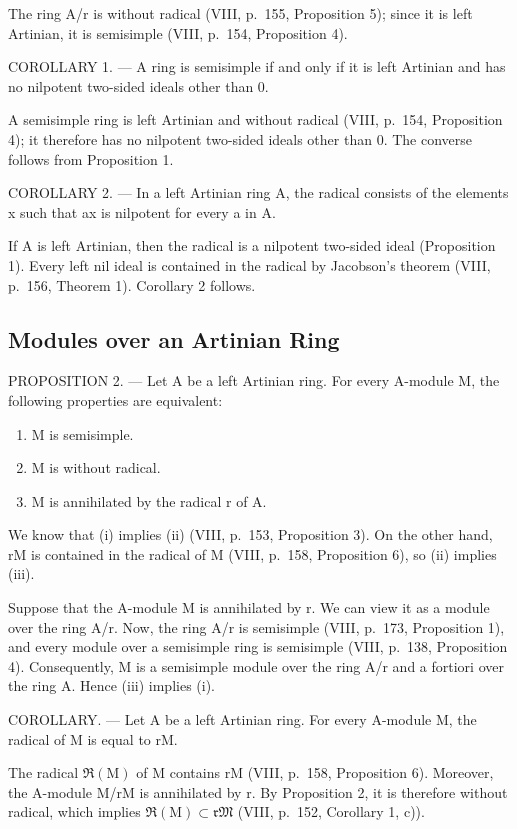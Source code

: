 The ring A/r is without radical (VIII, p.~155, Proposition 5); since it is left Artinian, it is semisimple (VIII, p.~154, Proposition 4).

COROLLARY 1. --- A ring is semisimple if and only if it is left Artinian and has no nilpotent two-sided ideals other than 0.

A semisimple ring is left Artinian and without radical (VIII, p.~154, Proposition 4); it therefore has no nilpotent two-sided ideals other than 0. The converse follows from Proposition 1.

COROLLARY 2. --- In a left Artinian ring A, the radical consists of the elements x such that ax is nilpotent for every a in A.

If A is left Artinian, then the radical is a nilpotent two-sided ideal (Proposition 1). Every left nil ideal is contained in the radical by Jacobson's theorem (VIII, p.~156, Theorem 1). Corollary 2 follows.

\subsection{Modules over an Artinian Ring}

PROPOSITION 2. --- Let A be a left Artinian ring. For every A-module M, the following properties are equivalent:

\begin{enumerate}
\def\labelenumi{(\roman{enumi})}
\item
  M is semisimple.
\item
  M is without radical.
\item
  M is annihilated by the radical r of A.
\end{enumerate}

We know that (i) implies (ii) (VIII, p.~153, Proposition 3). On the other hand, rM is contained in the radical of M (VIII, p.~158, Proposition 6), so (ii) implies (iii).

Suppose that the A-module M is annihilated by r. We can view it as a module over the ring A/r. Now, the ring A/r is semisimple (VIII, p.~173, Proposition 1), and every module over a semisimple ring is semisimple (VIII, p.~138, Proposition 4). Consequently, M is a semisimple module over the ring A/r and a fortiori over the ring A. Hence (iii) implies (i).

COROLLARY. --- Let A be a left Artinian ring. For every A-module M, the radical of M is equal to rM.

The radical \(\Re(\mathrm{M})\) of M contains rM (VIII, p.~158, Proposition 6). Moreover, the A-module M/rM is annihilated by r. By Proposition 2, it is therefore without radical, which implies \(\Re(\mathrm{M}) \subset \mathfrak{rM}\) (VIII, p.~152, Corollary 1, c)).

